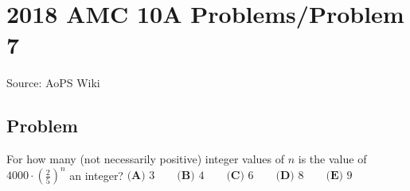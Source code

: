 \documentclass[12pt]{article}
\begin{document}
\section*{{2018 AMC 10A Problems/Problem 7}}
Source: AoPS Wiki

\subsection*{Problem}
For how many (not necessarily positive) integer values of $n$ is the value of $4000\cdot \left(\tfrac{2}{5}\right)^n$ an integer? $\textbf{(A) }3 \qquad \textbf{(B) }4 \qquad \textbf{(C) }6 \qquad \textbf{(D) }8 \qquad \textbf{(E) }9 \qquad$
\end{document}
